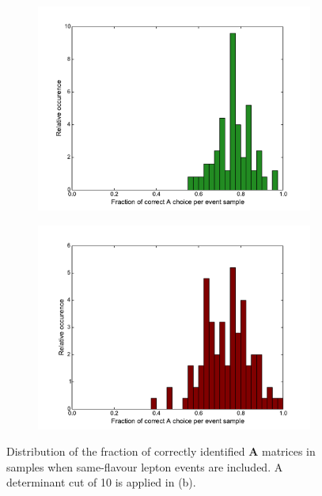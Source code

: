 \documentclass[twoside,english]{uiofysmaster}
\begin{document}
\begin{figure}[hbt]
	\centering
	\begin{subfigure}[b]{0.45\textwidth}
		\includegraphics[width=\textwidth]{figures/improving_combinatorics/histogram-OSFL-pairwise_A_selection-fraction_of_corr_A-nodetAcut.pdf} 
		\caption{ }
		\label{fig:correct_A_preference_distribution_OSFL_a}
	\end{subfigure}
	\begin{subfigure}[b]{0.45\textwidth}
		\includegraphics[width=\textwidth]{figures/improving_combinatorics/histogram-OSFL-pairwise_A_selection-fraction_of_corr_A-detAcut10.pdf} 
		\caption{ }
		\label{fig:correct_A_preference_distribution_OSFL_b}
	\end{subfigure}
	\caption{Distribution of the fraction of correctly identified $\mathbf{A}$ matrices in samples when same-flavour lepton events are included. A determinant cut of 10 is applied in (b).}
	\label{fig:correct_A_preference_distribution_OSFL}
\end{figure}
\end{document}
